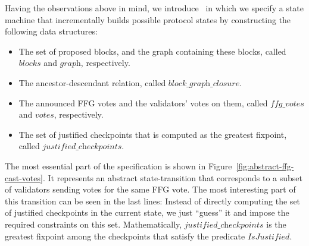 Having the observations above in mind, we introduce~\SpecThree{} in which we
specify a state machine that incrementally builds possible protocol states by
constructing the following data structures:

\begin{itemize}

    \item The set of proposed blocks, and the graph containing these blocks,
        called $\textit{blocks}$ and $\textit{graph}$, respectively.

    \item The ancestor-descendant relation, called
        $\textit{block\_graph\_closure}$.

    \item The announced FFG votes and the validators' votes on them, called
        $\textit{ffg\_votes}$ and $\textit{votes}$, respectively.

    \item The set of justified checkpoints that is computed as the greatest
        fixpoint, called $\textit{justified\_checkpoints}$.

\end{itemize}

The most essential part of the specification is shown in
Figure~\ref{fig:abstract-ffg-cast-votes}. It represents an abstract
state-transition that corresponds to a subset of validators sending votes for
the same FFG vote. The most interesting part of this transition can be seen in
the last lines: Instead of directly computing the set of justified checkpoints
in the current state, we just ``guess'' it and impose the required constraints
on this set. Mathematically, $\textit{justified\_checkpoints}$ is the greatest
fixpoint among the checkpoints that satisfy the predicate
$\textit{IsJustified}$.


